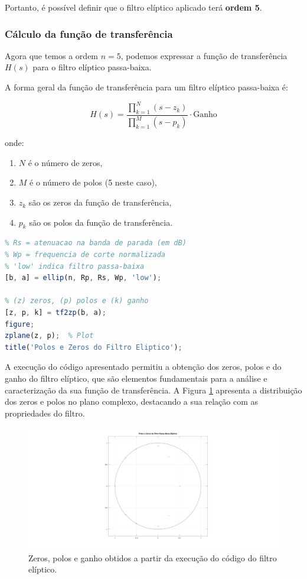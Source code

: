 Portanto, é possível definir que o filtro elíptico aplicado terá \textbf{ordem 5}.


\subsubsection*{Cálculo da função de transferência}

Agora que temos a ordem $n = 5$, podemos expressar a função de transferência $H(s)$ para o filtro elíptico passa-baixa.

A forma geral da função de transferência para um filtro elíptico passa-baixa é:

$$
    H(s) = \frac{\prod_{k=1}^{N} (s - z_k)}{\prod_{k=1}^{M} (s - p_k)} \cdot \text{Ganho}
$$

onde:
\begin{enumerate}
    \item $N$ é o número de zeros,
    \item $M$ é o número de polos (5 neste caso),
    \item $z_k$ são os zeros da função de transferência,
    \item $p_k$ são os polos da função de transferência.
\end{enumerate}

\begin{lstlisting}[language=Octave]
% n = ordem, Rp = ripple na banda passante (em dB)
% Rs = atenuacao na banda de parada (em dB)
% Wp = frequencia de corte normalizada
% 'low' indica filtro passa-baixa
[b, a] = ellip(n, Rp, Rs, Wp, 'low');

% (z) zeros, (p) polos e (k) ganho
[z, p, k] = tf2zp(b, a);
figure;
zplane(z, p);  % Plot
title('Polos e Zeros do Filtro Eliptico');
\end{lstlisting}

A execução do código apresentado permitiu a obtenção dos zeros, polos e do ganho do filtro elíptico, que são elementos fundamentais para a análise e caracterização da sua função de transferência. A Figura \ref{fig:elliptic_zeros_and_poles} apresenta a distribuição dos zeros e polos no plano complexo, destacando a sua relação com as propriedades do filtro.

\begin{figure}[H]
    \centering
    \includegraphics[width=1\linewidth]{02_analytic_development/assets/elliptic_zeroes_and_poles.png}
    \caption{Zeros, polos e ganho obtidos a partir da execução do código do filtro elíptico.}
    \label{fig:elliptic_zeros_and_poles}
\end{figure}

